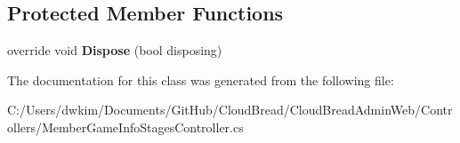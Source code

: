 \subsection*{Protected Member Functions}
\begin{DoxyCompactItemize}
\item 
override void {\bfseries Dispose} (bool disposing)\hypertarget{class_cloud_bread_admin_web_1_1_controllers_1_1_member_game_info_stages_controller_ae26cdc9cb6457146e8687987c5c5bff5}{}\label{class_cloud_bread_admin_web_1_1_controllers_1_1_member_game_info_stages_controller_ae26cdc9cb6457146e8687987c5c5bff5}

\end{DoxyCompactItemize}


The documentation for this class was generated from the following file\+:\begin{DoxyCompactItemize}
\item 
C\+:/\+Users/dwkim/\+Documents/\+Git\+Hub/\+Cloud\+Bread/\+Cloud\+Bread\+Admin\+Web/\+Controllers/Member\+Game\+Info\+Stages\+Controller.\+cs\end{DoxyCompactItemize}
